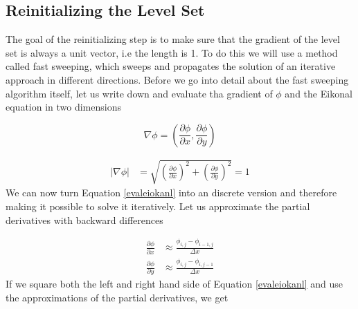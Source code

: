 \subsection{Reinitializing the Level Set}

The goal of the reinitializing step is to make sure that the gradient of the level set is always a unit vector, i.e the length is 1. To do this we will use a method called fast sweeping, which sweeps and propagates the solution of an iterative approach in different directions. Before we go into detail about the fast sweeping algorithm itself, let us write down and evaluate tha gradient of $\phi$ and the Eikonal equation in two dimensions

\begin{equation}
\nabla \phi = (\frac{\partial \phi}{\partial x}, \frac{\partial \phi}{\partial y})
\end{equation}

\begin{equation}
\begin{split}
|\nabla \phi| &= \sqrt{{(\frac{\partial \phi}{\partial x})}^2 + {(\frac{\partial \phi}{\partial y})}^2}  = 1
\end{split}
\label{evaleiokanl}
\end{equation}
\noindent
We can now turn Equation \ref{evaleiokanl} into an discrete version and therefore making it possible to solve it iteratively. Let us approximate the partial derivatives with backward differences

\begin{equation}
\begin{split}
\frac{\partial \phi}{\partial x} &\approx \frac{\phi_{i,j} - \phi_{i-1,j}}{\Delta x} \\
\frac{\partial \phi}{\partial y} &\approx \frac{\phi_{i,j} - \phi_{i,j-1}}{\Delta x}
\end{split}
\label{phiapproxeq}
\end{equation}
\noindent
If we square both the left and right hand side of Equation \ref{evaleiokanl} and use the approximations of the partial derivatives, we get

